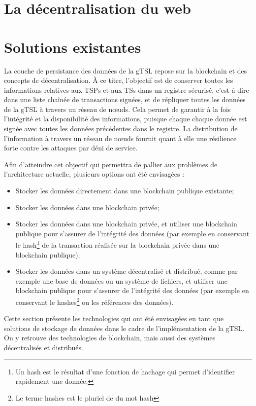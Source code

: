 \documentclass{tnreport}
\begin{document}
\section{La décentralisation du web}

\section{Solutions existantes}

La couche de persistance des données de la gTSL repose sur la blockchain et des concepts de décentralisation. À ce titre, l'objectif est de conserver toutes les informations relatives aux TSPs et aux TSs dans un registre sécurisé, c'est-à-dire dans une liste chaînée de transactions signées, et de répliquer toutes les données de la gTSL à travers un réseau de nœuds.
Cela permet de garantir à la fois l'intégrité et la disponibilité des informations, puisque chaque chaque donnée est signée avec toutes les données précédentes dans le registre. La distribution de l'information à travers un réseau de nœuds fournit quant à elle une résilience forte contre les attaques par déni de service.

Afin d'atteindre cet objectif qui permettra de pallier aux problèmes de l'architecture actuelle, plusieurs options ont été envisagées :
\begin{itemize}
	\item Stocker les données directement dans une blockchain publique existante;
	\item Stocker les données dans une blockchain privée;
	\item Stocker les données dans une blockchain privée, et utiliser une blockchain publique pour s'assurer de l'intégrité des données (par exemple en conservant le hash\footnote{Un hash est le résultat d'une fonction de hachage qui permet d'identifier rapidement une donnée.} de la transaction réalisée sur la blockchain privée dans une blockchain publique);
	\item Stocker les données dans un système décentralisé et distribué, comme par exemple une base de données ou un système de fichiers, et utiliser une blockchain publique pour s'assurer de l'intégrité des données (par exemple en conservant le hashes\footnote{Le terme hashes est le pluriel de du mot hash} ou les références des données).
\end{itemize}

Cette section présente les technologies qui ont été envisagées en tant que solutions de stockage de données dans le cadre de l'implémentation de la gTSL. On y retrouve des technologies de blockchain, mais aussi des systèmes décentralisés et distribués.
\end{document}
